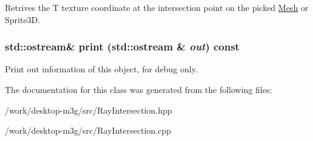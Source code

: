 Retrives the T texture coordinate at the intersection point on the picked \hyperlink{classm3g_1_1Mesh}{Mesh} or Sprite3D. \hypertarget{classm3g_1_1RayIntersection_d6bd96bbcbdd53ede8e72f8f13c0da48}{
\subsubsection[{print}]{\setlength{\rightskip}{0pt plus 5cm}std::ostream\& print (std::ostream \& {\em out}) const}}
\label{classm3g_1_1RayIntersection_d6bd96bbcbdd53ede8e72f8f13c0da48}


Print out information of this object, for debug only. 

The documentation for this class was generated from the following files:\begin{CompactItemize}
\item 
/work/desktop-m3g/src/RayIntersection.hpp\item 
/work/desktop-m3g/src/RayIntersection.cpp\end{CompactItemize}
